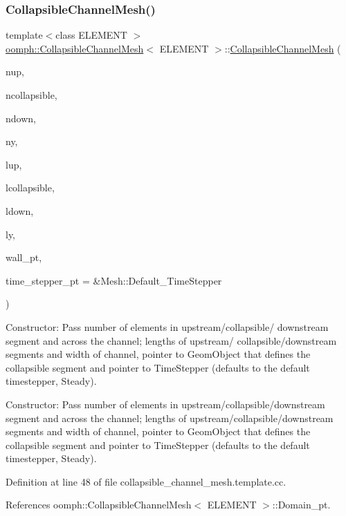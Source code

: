 \subsubsection{\texorpdfstring{Collapsible\+Channel\+Mesh()}{CollapsibleChannelMesh()}}
{\footnotesize\ttfamily template$<$class E\+L\+E\+M\+E\+NT $>$ \\
\hyperlink{classoomph_1_1CollapsibleChannelMesh}{oomph\+::\+Collapsible\+Channel\+Mesh}$<$ E\+L\+E\+M\+E\+NT $>$\+::\hyperlink{classoomph_1_1CollapsibleChannelMesh}{Collapsible\+Channel\+Mesh} (\begin{DoxyParamCaption}\item[{const unsigned \&}]{nup,  }\item[{const unsigned \&}]{ncollapsible,  }\item[{const unsigned \&}]{ndown,  }\item[{const unsigned \&}]{ny,  }\item[{const double \&}]{lup,  }\item[{const double \&}]{lcollapsible,  }\item[{const double \&}]{ldown,  }\item[{const double \&}]{ly,  }\item[{Geom\+Object $\ast$}]{wall\+\_\+pt,  }\item[{Time\+Stepper $\ast$}]{time\+\_\+stepper\+\_\+pt = {\ttfamily \&Mesh\+:\+:Default\+\_\+TimeStepper} }\end{DoxyParamCaption})}



Constructor\+: Pass number of elements in upstream/collapsible/ downstream segment and across the channel; lengths of upstream/ collapsible/downstream segments and width of channel, pointer to Geom\+Object that defines the collapsible segment and pointer to Time\+Stepper (defaults to the default timestepper, Steady). 

Constructor\+: Pass number of elements in upstream/collapsible/downstream segment and across the channel; lengths of upstream/collapsible/downstream segments and width of channel, pointer to Geom\+Object that defines the collapsible segment and pointer to Time\+Stepper (defaults to the default timestepper, Steady). 

Definition at line 48 of file collapsible\+\_\+channel\+\_\+mesh.\+template.\+cc.



References oomph\+::\+Collapsible\+Channel\+Mesh$<$ E\+L\+E\+M\+E\+N\+T $>$\+::\+Domain\+\_\+pt.

